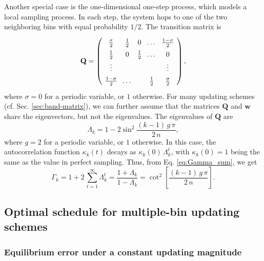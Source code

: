 \documentclass[reprint, floatfix]{revtex4-1}
\begin{document}
Another special case is the
one-dimensional one-step process\cite{vankampen},
which models a local sampling process.
In each step, the system hops to
one of the two neighboring bins
with equal probability $1/2$.
%
The transition matrix is
%
\begin{equation}
  \arraycolsep=3.6pt\def\arraystretch{1.4}
  \mathbf Q
  =
  \left(
    \begin{array}{cccccccc}
      \frac \sigma 2 & \frac 1 2 & 0 & \dots & \frac {1 - \sigma} 2 \\
      \frac 1 2 & 0         & \frac 1 2 & \dots & 0 \\
      \vdots & &  & & \vdots \\
      \frac {1 - \sigma} 2 & \dots &  & \frac 1 2 & \frac \sigma 2
    \end{array}
  \right),
\notag
\end{equation}
%
where $\sigma = 0$ for a periodic variable, or $1$ otherwise.
%
For many updating schemes
(cf. Sec. \ref{sec:band-matrix}),
we can further assume that
the matrices $\mathbf Q$ and $\mathbf w$
share the eigenvectors, but not the eigenvalues.
%
The eigenvalues of $\mathbf Q$ are
$$
\Lambda_k
=
1 -
2 \sin^2 \frac{ (k - 1) \, g \, \pi }
              {       2 \, n        }
,
$$
where
$g = 2$ for a periodic variable, or $1$ otherwise.
%
In this case,
the autocorrelation function $\kappa_k(t)$
decays as $\kappa_k(0) \, \Lambda_k^t$,
with $\kappa_k(0) = 1$ being the same as
the value in perfect sampling.
%
Thus,
from Eq. \eqref{eq:Gamma_sum}, we get
%
\begin{equation}
  \Gamma_k
  =
  1 + 2 \, \sum_{t = 1}^\infty \Lambda_k^t
  =
  \frac{ 1 + \Lambda_k }
       { 1 - \Lambda_k }
  =
  \cot^2 \left[
    \frac{ (k - 1) \, g \, \pi }
         { 2 \, n }
  \right]
  .
\label{eq:Gamma_onestep}
\end{equation}
%



\subsection{\label{sec:mbin_opta}
Optimal schedule for multiple-bin updating schemes}



\subsubsection{\label{sec:eqlerr}
Equilibrium error under a constant updating magnitude
}
\end{document}
